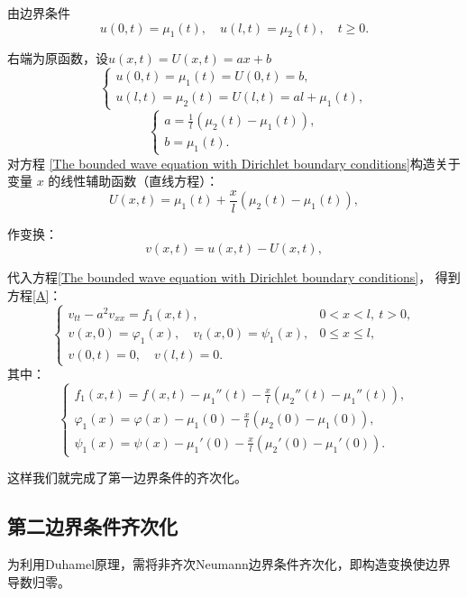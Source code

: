 \documentclass[12pt,a4paper]{article}
\numberwithin{subsection}{section}   %
\numberwithin{subsubsection}{subsection}
\theoremstyle{plain}
\theoremstyle{definition}
\theoremstyle{remark}
\theoremstyle{remark}
\begin{document}
	由边界条件
	\begin{equation}
		u(0,t) = \mu_1(t), \quad u(l,t) = \mu_2(t), \quad t \geq 0.
	\end{equation}
	
	右端为原函数，设$u(x, t)=U(x, t)=ax+b$
	\[
	\begin{cases}
		u(0, t) = \mu_1(t) = U(0, t) = b, \\
		u(l, t) = \mu_2(t) = U(l, t) = al + \mu_1(t),
	\end{cases}
	\]
	\[
	\begin{cases}
		a = \frac{1}{l}(\mu_2(t) - \mu_1(t)), \\
		b = \mu_1(t).
	\end{cases}
	\]
	对方程 \eqref{The bounded wave equation with Dirichlet boundary conditions}构造关于变量 \(x\) 的线性辅助函数（直线方程）：
	\begin{equation}
		U(x, t) = \mu_1(t) + \frac{x}{l}(\mu_2(t) - \mu_1(t)),
	\end{equation}
	
	作变换：
	\begin{equation}
		v(x, t) = u(x, t) - U(x, t),
	\end{equation}
	
	 代入方程\eqref{The bounded wave equation with Dirichlet boundary conditions}，
	得到方程\eqref{A}：
	\begin{equation}\label{A}
	\begin{cases}
		v_{tt} - a^2 v_{xx} = f_1(x, t), & 0 < x < l, \ t > 0, \\
		v(x, 0) = \varphi_1(x), \quad v_t(x, 0) = \psi_1(x), & 0 \leq x \leq l, \\
		v(0, t) = 0, \quad v(l, t) = 0. &
	\end{cases}
\end{equation}
	其中：
	\begin{equation}
		\begin{cases}
			f_1(x, t) = f(x, t) - \mu_1''(t) - \frac{x}{l}(\mu_2''(t) - \mu_1''(t)), \\
			\varphi_1(x) = \varphi(x) - \mu_1(0) - \frac{x}{l}(\mu_2(0) - \mu_1(0)), \\
			\psi_1(x) = \psi(x) - \mu_1'(0) - \frac{x}{l}(\mu_2'(0) - \mu_1'(0)).
		\end{cases}
	\end{equation}
	
	这样我们就完成了第一边界条件的齐次化。
	
	\subsection{第二边界条件齐次化}
	为利用Duhamel原理，需将非齐次Neumann边界条件齐次化，即构造变换使边界导数归零。
\end{document}
